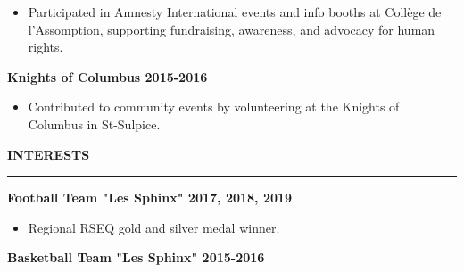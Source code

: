 \documentclass[letterpaper,11pt]{article}
\begin{document}
\begin{itemize}
\setlength{\itemsep}{-3pt}
\item
  Participated in Amnesty International events and info booths at
  Collège de l'Assomption, supporting fundraising, awareness, and
  advocacy for human rights.
\end{itemize}

\textbf{Knights of Columbus \hfill 2015-2016}

\begin{itemize}
\setlength{\itemsep}{-3pt}
\item
  Contributed to community events by volunteering at the Knights of Columbus in St-Sulpice.
\end{itemize}


\textbf{INTERESTS}\par
\vspace{-20pt}
\rule{\textwidth}{0.4pt}
\textbf{Football Team "Les Sphinx" \hfill 2017, 2018, 2019}

\begin{itemize}
\item
  Regional RSEQ gold and silver medal winner.
\end{itemize}

\textbf{Basketball Team "Les Sphinx" \hfill 2015-2016}
\end{document}
